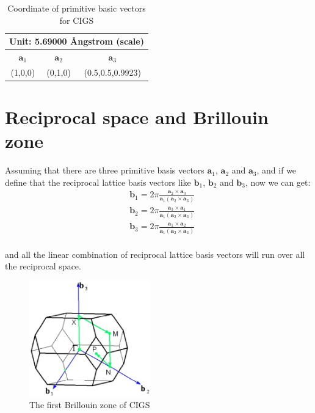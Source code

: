 \documentclass[a4paper]{report}
\begin{document}
\begin{table}
\begin{center}
\begin{tabular}{|c|c|c|}
  \hline
  \multicolumn{3}{|c|}{Unit: 5.69000 {\AA}ngstrom (scale)} \\
  \hline
  $\textbf{a}_1$ & $\textbf{a}_2$ & $\textbf{a}_3$ \\ \hline
   (1,0,0) & (0,1,0) & (0.5,0.5,0.9923)   \\ 
  \hline
\end{tabular}
\caption{Coordinate of primitive basic vectors for CIGS}
\end{center}
\end{table}

\section{Reciprocal space and Brillouin zone}
\noindent Assuming that there are three primitive basis vectors  $\textbf{a}_{1}$, $\textbf{a}_{2}$ and  $\textbf{a}_{3}$, and if we define that the reciprocal lattice basis vectors
like  $\textbf{b}_{1}$, $\textbf{b}_{2}$ and  $\textbf{b}_{3}$, now we can get:
\begin{equation}\begin{split}
& \textbf{b}_1 = 2 \pi \frac{\textbf{a}_2 \times \textbf{a}_3}{\textbf{a}_1 (\textbf{a}_2 \times \textbf{a}_3)} \\
& \textbf{b}_2 = 2 \pi \frac{\textbf{a}_3 \times \textbf{a}_1}{\textbf{a}_1 (\textbf{a}_2 \times \textbf{a}_3)} \\
& \textbf{b}_3 = 2 \pi \frac{\textbf{a}_1 \times \textbf{a}_2}{\textbf{a}_1 (\textbf{a}_2 \times \textbf{a}_3)} \\
\end{split}\end{equation}

\noindent and all the linear combination of reciprocal lattice basis vectors will run over all the reciprocal space.

\begin{figure}[h]\label{bz}
\begin{center}
\includegraphics[height=50mm]{bz.eps}
\caption{The first Brillouin zone of CIGS}
\end{center}
\end{figure}
\end{document}

